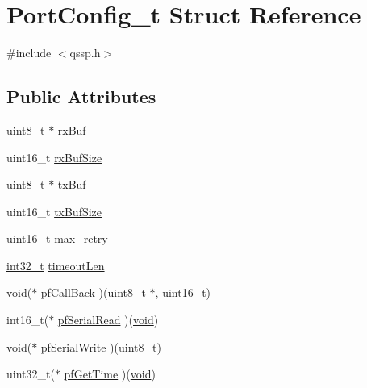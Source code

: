 \hypertarget{struct_port_config__t}{\section{Port\-Config\-\_\-t Struct Reference}
\label{struct_port_config__t}
}


{\ttfamily \#include $<$qssp.\-h$>$}

\subsection*{Public Attributes}
\begin{DoxyCompactItemize}
\item 
uint8\-\_\-t $\ast$ \hyperlink{group___uploader_gaf9c6613e85487823c8b69881abf4f4b2}{rx\-Buf}
\item 
uint16\-\_\-t \hyperlink{group___uploader_ga2f1cf7a3eabee4b4fa51aeedb4e7f708}{rx\-Buf\-Size}
\item 
uint8\-\_\-t $\ast$ \hyperlink{group___uploader_gafcdd55fafcda334941b490883a8185f7}{tx\-Buf}
\item 
uint16\-\_\-t \hyperlink{group___uploader_gacc8a53158605f7a72f895d2a80036137}{tx\-Buf\-Size}
\item 
uint16\-\_\-t \hyperlink{group___uploader_ga780cb1cf13c87035b0715a39dec4981b}{max\-\_\-retry}
\item 
\hyperlink{glext_8h_a37994e3b11c72957c6f454c6ec96d43d}{int32\-\_\-t} \hyperlink{group___uploader_ga13c21abf5c985cf8f33e4a6ccc45310f}{timeout\-Len}
\item 
\hyperlink{group___u_a_v_objects_plugin_ga444cf2ff3f0ecbe028adce838d373f5c}{void}($\ast$ \hyperlink{struct_port_config__t_a761912e7c4f6babdbf30bc5427212175}{pf\-Call\-Back} )(uint8\-\_\-t $\ast$, uint16\-\_\-t)
\item 
int16\-\_\-t($\ast$ \hyperlink{struct_port_config__t_a99013e72ff1a44c3d4ffc9d4f645862d}{pf\-Serial\-Read} )(\hyperlink{group___u_a_v_objects_plugin_ga444cf2ff3f0ecbe028adce838d373f5c}{void})
\item 
\hyperlink{group___u_a_v_objects_plugin_ga444cf2ff3f0ecbe028adce838d373f5c}{void}($\ast$ \hyperlink{struct_port_config__t_a4f05f6e2fc7ec69a863b303e44191881}{pf\-Serial\-Write} )(uint8\-\_\-t)
\item 
uint32\-\_\-t($\ast$ \hyperlink{struct_port_config__t_aacab2789effcced0f99bff1dbceb2bbe}{pf\-Get\-Time} )(\hyperlink{group___u_a_v_objects_plugin_ga444cf2ff3f0ecbe028adce838d373f5c}{void})
\end{DoxyCompactItemize}


